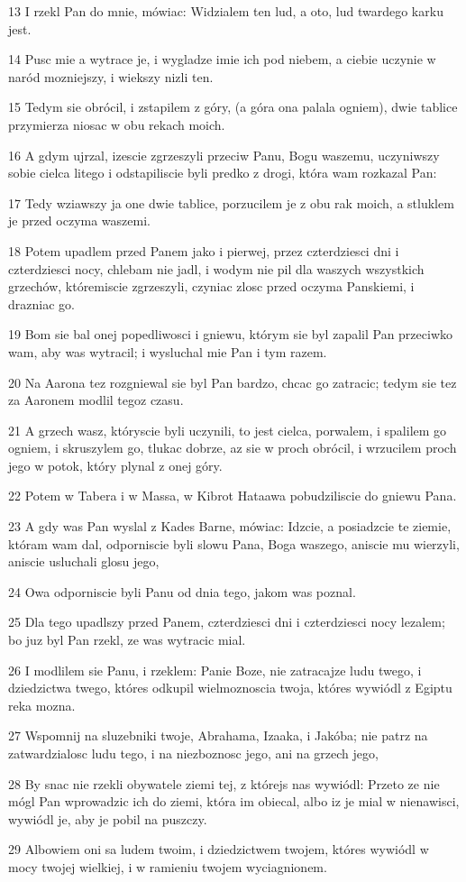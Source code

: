 \par 13 I rzekl Pan do mnie, mówiac: Widzialem ten lud, a oto, lud twardego karku jest.
\par 14 Pusc mie a wytrace je, i wygladze imie ich pod niebem, a ciebie uczynie w naród mozniejszy, i wiekszy nizli ten.
\par 15 Tedym sie obrócil, i zstapilem z góry, (a góra ona palala ogniem), dwie tablice przymierza niosac w obu rekach moich.
\par 16 A gdym ujrzal, izescie zgrzeszyli przeciw Panu, Bogu waszemu, uczyniwszy sobie cielca litego i odstapiliscie byli predko z drogi, która wam rozkazal Pan:
\par 17 Tedy wziawszy ja one dwie tablice, porzucilem je z obu rak moich, a stluklem je przed oczyma waszemi.
\par 18 Potem upadlem przed Panem jako i pierwej, przez czterdziesci dni i czterdziesci nocy, chlebam nie jadl, i wodym nie pil dla waszych wszystkich grzechów, któremiscie zgrzeszyli, czyniac zlosc przed oczyma Panskiemi, i drazniac go.
\par 19 Bom sie bal onej popedliwosci i gniewu, którym sie byl zapalil Pan przeciwko wam, aby was wytracil; i wysluchal mie Pan i tym razem.
\par 20 Na Aarona tez rozgniewal sie byl Pan bardzo, chcac go zatracic; tedym sie tez za Aaronem modlil tegoz czasu.
\par 21 A grzech wasz, któryscie byli uczynili, to jest cielca, porwalem, i spalilem go ogniem, i skruszylem go, tlukac dobrze, az sie w proch obrócil, i wrzucilem proch jego w potok, który plynal z onej góry.
\par 22 Potem w Tabera i w Massa, w Kibrot Hataawa pobudziliscie do gniewu Pana.
\par 23 A gdy was Pan wyslal z Kades Barne, mówiac: Idzcie, a posiadzcie te ziemie, któram wam dal, odporniscie byli slowu Pana, Boga waszego, aniscie mu wierzyli, aniscie usluchali glosu jego,
\par 24 Owa odporniscie byli Panu od dnia tego, jakom was poznal.
\par 25 Dla tego upadlszy przed Panem, czterdziesci dni i czterdziesci nocy lezalem; bo juz byl Pan rzekl, ze was wytracic mial.
\par 26 I modlilem sie Panu, i rzeklem: Panie Boze, nie zatracajze ludu twego, i dziedzictwa twego, któres odkupil wielmoznoscia twoja, któres wywiódl z Egiptu reka mozna.
\par 27 Wspomnij na sluzebniki twoje, Abrahama, Izaaka, i Jakóba; nie patrz na zatwardzialosc ludu tego, i na niezboznosc jego, ani na grzech jego,
\par 28 By snac nie rzekli obywatele ziemi tej, z którejs nas wywiódl: Przeto ze nie mógl Pan wprowadzic ich do ziemi, która im obiecal, albo iz je mial w nienawisci, wywiódl je, aby je pobil na puszczy.
\par 29 Albowiem oni sa ludem twoim, i dziedzictwem twojem, któres wywiódl w mocy twojej wielkiej, i w ramieniu twojem wyciagnionem.

